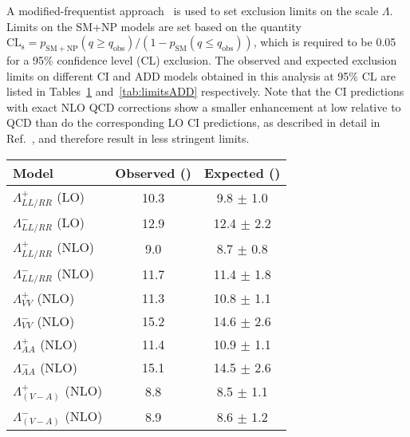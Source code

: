 \documentclass[11pt,twoside,a4paper,cmspaper,final,collab]{cms-tdr}
\begin{document}
A modified-frequentist
approach~\cite{junk:1999,read:2002,cousinshighland} is used to
set exclusion limits on the scale $\Lambda$.
Limits on
the SM+NP models are set based on the quantity $\mathrm{CL}_\mathrm{s} =
p_\mathrm{SM+NP}(q\geq q_\text{obs}) / (1-p_\mathrm{SM}(q \leq
q_\text{obs}))$, which is required to be 0.05 for a 95\%
confidence level (CL)  exclusion. The observed and expected
exclusion limits on different CI and ADD
models obtained in this analysis at 95\% CL are listed in
Tables~\ref{tab:limitsCI} and~\ref{tab:limitsADD} respectively. Note
that the CI predictions with exact NLO QCD corrections show a smaller
enhancement at low \chijj relative to QCD than do the corresponding LO
CI predictions, as described in detail in Ref.~\cite{Gao:2012qpa}, and
therefore result in less stringent limits.

\begin{table}[htbp]
  \centering
    \label{tab:limitsCI}
    \begin{tabular}{l|c|c}
     \hline
      Model & Observed (\TeVns{}) & Expected (\TeVns{}) \\
      \hline
      $\Lambda_{LL/RR}^{+}$ (LO) & 10.3 & 9.8 $\pm$ 1.0\\
      $\Lambda_{LL/RR}^{-}$ (LO) & 12.9 & 12.4 $\pm$ 2.2\\
      $\Lambda_{LL/RR}^{+}$ (NLO) & 9.0 & 8.7 $\pm$ 0.8\\
      $\Lambda_{LL/RR}^{-}$ (NLO) & 11.7 & 11.4 $\pm$ 1.8\\
      $\Lambda_{VV}^{+}$ (NLO) & 11.3 & 10.8 $\pm$ 1.1\\
      $\Lambda_{VV}^{-}$ (NLO) & 15.2 & 14.6 $\pm$ 2.6\\
      $\Lambda_{AA}^{+}$ (NLO) & 11.4 & 10.9 $\pm$ 1.1\\
      $\Lambda_{AA}^{-}$ (NLO) & 15.1 & 14.5 $\pm$ 2.6\\
      $\Lambda_{(V-A)}^{+}$ (NLO) & 8.8 & 8.5 $\pm$ 1.1\\
      $\Lambda_{(V-A)}^{-}$ (NLO) & 8.9 & 8.6 $\pm$ 1.2\\
      \hline
    \end{tabular}
\end{table}
\end{document}

